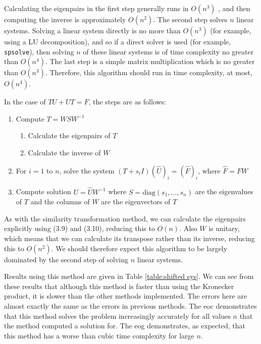 \documentclass[11pt]{article}
\numberwithin{equation}{section}
\begin{document}
Calculating the eigenpairs in the first step generally runs in $O(n^3)$ \cite{Laub}, and then computing the inverse is approximately $O(n^2)$. The second step solves $n$ linear systems. Solving a linear system directly is no more than $O(n^3)$ (for example, using a LU decomposition), and so if a direct solver is used (for example, \texttt{spsolve}), then solving $n$ of these linear systems is of time complexity no greater than $O(n^4)$. The last step is a simple matrix multiplication which is no greater than $O(n^3)$. Therefore, this algorithm should run in time complexity, at most, $O(n^4)$.

In the case of $TU + UT = F$, the steps are as follows:
\begin{enumerate}
\item Compute $T = WSW^{-1}$
	\begin{enumerate}
	\item Calculate the eigenpairs of $T$
	\item Calculate the inverse of $W$
	\end{enumerate}
\item For $i=1$ to $n$, solve the system $(T+s_i I)(\hat{U})_i = (\hat{F})_i$, where $\hat{F} = FW$
\item Compute solution $U = \hat{U}W^{-1}$
where $S = \text{diag}(s_1, \dots, s_n)$ are the eigenvalues of $T$ and the columns of $W$ are the eigenvectors of $T$
\end{enumerate}
As with the similarity transformation method, we can calculate the eigenpairs explicitly using (3.9) and (3.10), reducing this to $O(n)$. Also $W$ is unitary, which means that we can calculate its transpose rather than its inverse, reducing this to $O(n^2)$. We should therefore expect this algorithm to be largely dominated by the second step of solving $n$ linear systems.

Results using this method are given in Table \ref{table:shifted sys}. We can see from these results that although this method is faster than using the Kronecker product, it is slower than the other methods implemented. The errors here are almost exactly the same as the errors in previous methods. The eoc demonstrates that this method solves the problem increasingly accurately for all values $n$ that the method computed a solution for. The eog demonstrates, as expected, that this method has a worse than cubic time complexity for large $n$.
\end{document}
